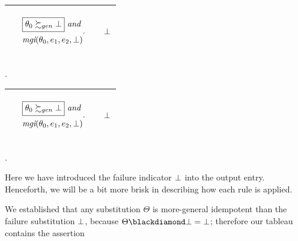 \documentclass[runningheads]{llncs}
\DeclareMathOperator{\uand}{\emph{and}\,}
\DeclareMathOperator{\mgi}{\emph{mgi}}
\begin{document}
\begin{center}
\begin{tabularx}{1.0\textwidth} { 
  | >{\raggedright\arraybackslash}X 
  | >{\raggedright\arraybackslash}X 
  || >{\raggedright\arraybackslash}X | }
 \hline 
  & 
  \begin{center}\vspace{-.5cm} 
${\begin{aligned} 
&\begin{aligned}
 \,\, & \boxed{\thet{0} \moregen \fail} \, \uand
\\
  \,\, & {\mgi}(\thet{0}, \e{1}, \e{2}, \fail)
\end{aligned}.\end{aligned}}$\hspace{1cm} 
\end{center} & \vspace{-.3cm}\begin{center}$\bot$ \end{center} \\
\hline
\end{tabularx}.
\end{center}

\begin{center}
\begin{tabularx}{1.0\textwidth} { 
  | >{\raggedright\arraybackslash}X 
  | >{\raggedright\arraybackslash}X 
  || >{\raggedright\arraybackslash}X | }
 \hline 
  & 
  \begin{center}\vspace{-.5cm} 
${\begin{aligned} 
&\begin{aligned}
 \,\, & \boxed{\thet{0} \moregen \fail} \, \uand
\\
  \,\, & {\mgi}(\thet{0}, \e{1}, \e{2}, \fail)
\end{aligned}.\end{aligned}}$\hspace{1cm} 
\end{center} & \vspace{-.3cm}\begin{center}$\bot$ \end{center} \\
\hline
\end{tabularx}.
\end{center}
Here we have introduced the failure indicator $\bot$ into the output entry.  Henceforth, we will be a bit more brisk in describing how each rule is applied.

We established that any substitution $\Theta$ is more-general idempotent than the failure substitution $\bot$, because $\Theta \compose \fail = \fail$; therefore our tableau contains the assertion 
\end{document}
